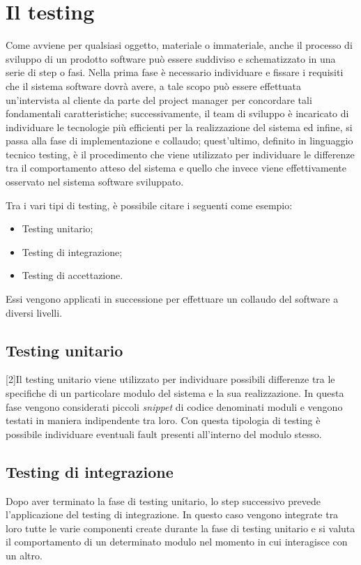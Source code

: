 \fancyhead[C]{}
\section{Il testing}
Come avviene per qualsiasi oggetto, materiale o immateriale, anche il
processo di sviluppo di un prodotto software può essere suddiviso e schematizzato in una serie di step o fasi. Nella prima fase è necessario individuare e fissare i requisiti che il sistema software dovrà avere, a tale scopo può essere effettuata
un’intervista al cliente da parte del project manager per concordare tali fondamentali caratteristiche; successivamente, il team di sviluppo è incaricato di individuare le tecnologie più efficienti per la realizzazione del sistema ed infine, si passa alla fase di implementazione e collaudo; quest’ultimo, definito in linguaggio
tecnico testing, è il procedimento che viene utilizzato per individuare le differenze tra il comportamento atteso del sistema e quello che invece viene effettivamente
osservato nel sistema software sviluppato.

Tra i vari tipi di testing, è possibile citare i seguenti come esempio:
\begin{itemize}
	\item Testing unitario;
	\item Testing di integrazione;
	\item Testing di accettazione.
\end{itemize}

Essi vengono applicati in successione per effettuare un collaudo del software
a diversi livelli.
\subsection{Testing unitario}
[2]Il testing unitario viene utilizzato per individuare possibili differenze tra le specifiche di un particolare modulo del sistema e la sua realizzazione. In questa fase vengono considerati piccoli \emph{snippet} di codice denominati moduli e vengono testati in maniera indipendente tra loro. Con questa tipologia di testing è possibile
individuare eventuali fault presenti all’interno del modulo stesso.
\subsection{Testing di integrazione}
Dopo aver terminato la fase di testing unitario, lo step successivo prevede l’applicazione del testing di integrazione. In questo caso vengono integrate tra loro tutte le varie componenti create durante la fase di testing unitario e si valuta il comportamento di un determinato modulo nel momento in cui interagisce con un altro.

